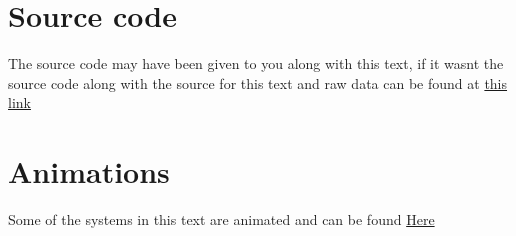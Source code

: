 \documentclass[10pt,a4paper,aps,twocolumn,secnumarabic,numerical,balancelastpage,nofootinbib,superscriptaddress]{revtex4-2}
\begin{document}
		\section{Source code}
		
			The source code may have been given to you along with this text, if it wasnt the source code along with the source for this text and raw data can be found at \href{https://github.com/Mannen-I-Skogen/TFY4230-Numerical}{this link}
			
		\section{Animations}
		
			Some of the systems in this text are animated and can be found \href{https://folk.ntnu.no/stiansjo/particles}{Here}
	
	
\end{document}
